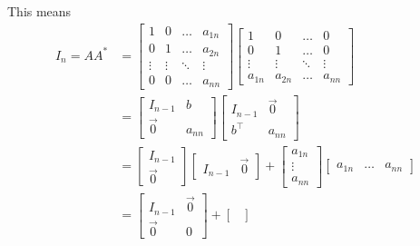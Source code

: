 \documentclass[answers]{exam}
\begin{document}
\begin{questions}
\begin{parts}
\begin{solution}
            This means
            \begin{align*}
                I_n = AA^* &= \begin{bmatrix}
                    1 & 0 & \dots & a_{1n} \\
                    0 & 1 & \dots & a_{2n} \\
                    \vdots &\vdots&\ddots & \vdots \\
                    0 & 0 & \dots & a_{nn}
                \end{bmatrix}\begin{bmatrix}
                    1 & 0 & \dots & 0 \\
                    0 & 1 & \dots & 0 \\
                    \vdots & \vdots & \ddots & \vdots \\
                    a_{1n} & a_{2n} & \dots & a_{nn}
                \end{bmatrix} \\
                &= \begin{bmatrix}
                    I_{n-1} & b \\
                    \vec{0} & a_{nn}
                \end{bmatrix}\begin{bmatrix}
                    I_{n-1} & \vec{0} \\
                    {b}^\top & {a_{nn}}
                \end{bmatrix} \\
                &= \begin{bmatrix} I_{n-1} \\ \vec{0} \end{bmatrix} 
                   \begin{bmatrix} I_{n-1} & \vec{0} \end{bmatrix} + 
                   \begin{bmatrix} a_{1n}\\\vdots\\a_{nn} \end{bmatrix}
                       \begin{bmatrix} {a_{1n}}&\dots&{a_{nn}}\end{bmatrix}\\
                &= \begin{bmatrix} I_{n-1} & \vec{0} \\
                    \vec{0} & 0\end{bmatrix} + 
                    \begin{bmatrix}

\end{bmatrix}
\end{align*}
\end{solution}
\end{parts}
\end{questions}
\end{document}
